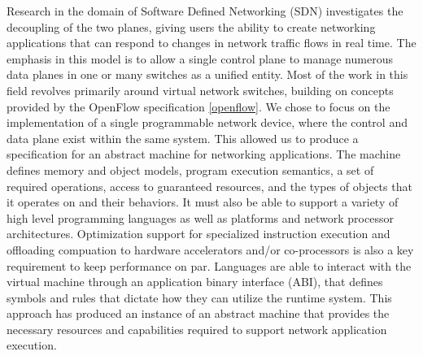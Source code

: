 Research in the domain of Software Defined Networking (SDN) investigates the
decoupling of the two planes, giving users the ability to create networking
applications that can respond to changes in network traffic flows in real time.
The emphasis in this model is to allow a single control plane to manage numerous
data planes in one or many switches as a unified entity. Most of the work in
this field revolves primarily around virtual network switches, building on
concepts provided by the OpenFlow specification \ref{openflow}. We chose to
focus on the implementation of a single programmable network device, where the
control and data plane exist within the same system. This allowed us to produce
a specification for an abstract machine for networking applications.
The machine defines memory and object models, program execution semantics,
a set of required operations, access to guaranteed resources, and the types
of objects that it operates on and their behaviors. It must also be able to
support a variety of high level programming languages as well as platforms
and network processor architectures. Optimization support for specialized
instruction execution and offloading compuation to hardware accelerators and/or
co-processors is also a key requirement to keep performance on par. Languages
are able to interact with the virtual machine through an application binary
interface (ABI), that defines symbols and rules that dictate how they can
utilize the runtime system. This approach has produced an instance of an
abstract machine that provides the necessary resources and capabilities
required to support network application execution.




